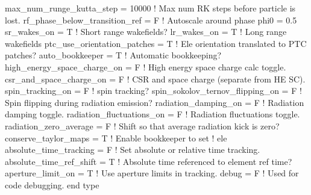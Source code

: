 {\begin{example}
    max_num_runge_kutta_step = 10000    ! Max num RK steps before particle is lost.
    rf_phase_below_transition_ref = F   ! Autoscale around phase phi0 = 0.5
    sr_wakes_on = T                     ! Short range wakefields?
    lr_wakes_on = T                     ! Long range wakefields
    ptc_use_orientation_patches = T     ! Ele orientation translated to PTC patches?
    auto_bookkeeper = T                 ! Automatic bookkeeping?
    high_energy_space_charge_on = F     ! High energy space charge calc toggle.
    csr_and_space_charge_on = F         ! CSR and space charge (separate from HE SC).
    spin_tracking_on = F                ! spin tracking?
    spin_sokolov_ternov_flipping_on = F ! Spin flipping during radiation emission?
    radiation_damping_on = F            ! Radiation damping toggle.
    radiation_fluctuations_on = F       ! Radiation fluctuations toggle.
    radiation_zero_average = F          ! Shift so that average radiation kick is zero?
    conserve_taylor_maps = T            ! Enable bookkeeper to set
                                        ! ele%
    absolute_time_tracking = F          ! Set absolute or relative time tracking.
    absolute_time_ref_shift = T         ! Absolute time referenced to element ref time?
    aperture_limit_on = T               ! Use aperture limits in tracking.
    debug = F                           ! Used for code debugging.
  end type
\end{example}

}
